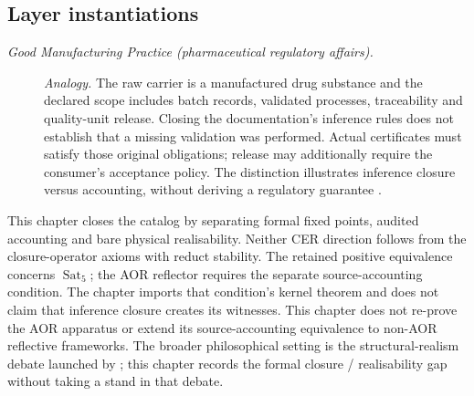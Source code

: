 \subsection*{Layer instantiations}\label{layer-inst:F53}

\begingroup\small
\begin{description}
\item[\emph{Good Manufacturing Practice
(pharmaceutical regulatory affairs).}] \textit{Analogy.}
The raw carrier is a manufactured drug substance and the declared scope
includes batch records, validated processes, traceability and quality-unit
release. Closing the documentation's inference rules does not establish
that a missing validation was performed. Actual certificates must satisfy
those original obligations; release may additionally require the consumer's
acceptance policy. The distinction illustrates inference closure versus
accounting, without deriving a regulatory guarantee \citep{ICH2016Q7}.

\end{description}
\endgroup


This chapter closes the catalog by separating formal fixed points, audited
accounting and bare physical realisability. Neither CER direction follows
from the closure-operator axioms with reduct stability. The retained positive
equivalence concerns \(\operatorname{Sat}_5\); the AOR reflector
requires the separate source-accounting condition. The chapter imports that
condition's kernel theorem and does not claim that inference closure creates
its witnesses. This chapter does not re-prove the AOR apparatus or extend its
source-accounting equivalence to non-AOR reflective frameworks. The broader philosophical setting is the structural-realism
debate launched by \citet{Worrall1989StructuralRealism}; this chapter records
the formal closure / realisability gap without taking a stand in that debate.
